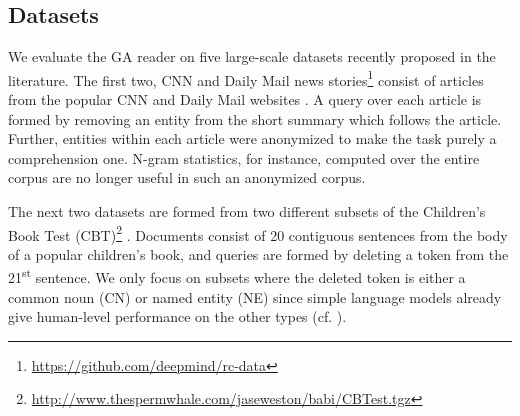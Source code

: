 \documentclass[11pt,a4paper]{article}
\begin{document}
\subsection{Datasets}

We evaluate the GA reader on five large-scale datasets recently proposed in the literature. The first two, CNN and Daily Mail news stories\footnote{\scriptsize \url{https://github.com/deepmind/rc-data}} consist of articles from the popular CNN and Daily Mail websites \citep{hermann2015teaching}. A query over each article is formed by removing an entity from the short summary which follows the article. Further, entities within each article were anonymized to make the task purely a comprehension one. N-gram statistics, for instance, computed over the entire corpus are no longer useful in such an anonymized corpus.

The next two datasets are formed from two different subsets of the Children's Book Test (CBT)\footnote{\scriptsize \url{http://www.thespermwhale.com/jaseweston/babi/CBTest.tgz}} \citep{hill2015goldilocks}. Documents consist of 20 contiguous sentences from the body of a popular children's book, and queries are formed by deleting a token from the 21\textsuperscript{st} sentence. We only focus on subsets where the deleted token is either a common noun (CN) or named entity (NE) since simple language models already give human-level performance on the other types (cf. \citep{hill2015goldilocks}).
\end{document}
